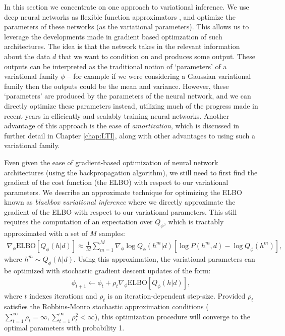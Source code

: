 In this section we concentrate on one approach to variational inference. We use deep neural networks as flexible function approximators \citep{dayan1995helmholtz,kingma2014auto,mnih2014neural,rezende2015variational,paige2016inference}, and optimize the parameters of these networks (as the variational parameters). This allows us to leverage the developments made in gradient based optimzation of such architectures. The idea is that the network takes in the relevant information about the data $d$ that we want to condition on and produces some output. These outputs can be interpreted as the traditional notion of `parameters' of a variational family $\phi$ -- for example if we were considering a Gaussian variational family then the outputs could be the mean and variance. However, these `parameters' are produced by the parameters of the neural network, and we can directly optimize these parameters instead, utilizing much of the progress made in recent years in efficiently and scalably training neural networks. Another advantage of this approach is the ease of \textit{amortization}, which is discussed in further detail in Chapter \ref{chap:LTI}, along with other advantages to using such a variational family.

Even given the ease of gradient-based optimization of neural network architectures (using the backpropagation algorithm), we still need to first find the gradient of the cost function (the ELBO) with respect to our variational parameters. We describe an approximate technique for optimizing the ELBO known as \emph{blackbox variational inference} \citep{ranganath2014black} where we directly approximate the gradient of the ELBO with respect to our variational parameters. This still requires the computation of an expectation over $Q_\phi$, which is tractably approximated with a set of $M$ samples:
\begin{align}
    \nabla_\phi \text{ELBO}[Q_\phi(h|d)] \approx \frac{1}{M} \sum_{m=1}^M \nabla_\phi \log Q_\phi(h^m|d) \left[ \log P(h^m,d) - \log Q_\phi(h^m) \right],
\end{align}
where $h^m \sim Q_\phi(h|d)$. Using this approximation, the variational parameters can be optimized with stochastic gradient descent updates of the form:
\begin{align}
    \phi_{t+1} \leftarrow \phi_t + \rho_t \nabla_\phi \text{ELBO}[Q_\phi(h|d)],
\end{align}
where $t$ indexes iterations and $\rho_t$ is an iteration-dependent step-size. Provided $\rho_t$ satisfies the Robbins-Monro stochastic approximation conditions ($\sum_{t=1}^\infty \rho_t = \infty, \sum_{t=1}^\infty \rho_t^2 < \infty$), this optimization procedure will converge to the optimal parameters with probability 1.

